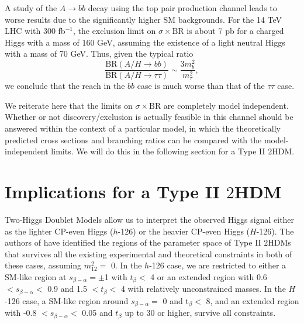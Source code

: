 A study of the $A \rightarrow bb$ decay using the top pair production channel leads to worse results due to the significantly higher SM backgrounds. For the 14 TeV LHC with 300 fb$^{-1}$, the exclusion limit on $\sigma \times \text{BR}$ is about 7 pb for a charged Higgs with a mass of 160 GeV, assuming the existence of a light neutral Higgs with a mass of 70 GeV. Thus, given the typical ratio 
\[\frac{\text{BR}(A/H \rightarrow bb)}{\text{BR}(A/H\rightarrow \tau\tau)} \sim \frac{3m^2_b}{m^2_{\tau}},\]
we conclude that the reach in the $bb$ case is much worse than that of the $\tau\tau$ case.

We reiterate here that the limits on $\sigma \times \text{BR}$ are completely model independent. Whether or not discovery/exclusion is actually feasible in this channel should be answered within the context of a particular model, in which the theoretically predicted cross sections and branching ratios can be compared with the model-independent limits. We will do this in the following section for a Type II $2$HDM. 

\section{Implications for a Type II $2$HDM}\label{sec:implication}

Two-Higgs Doublet Models allow us to interpret the observed Higgs signal either as the lighter CP-even Higgs ($h$-126) or the heavier CP-even Higgs ($H$-126). The authors of \cite{Coleppa:2013dya} have identified the regions of the parameter space of Type II $2$HDMs that survives all the existing experimental and theoretical constraints in both of these cases, assuming $m_{12}^2=$ 0. In the $h$-126 case, we are restricted to either a SM-like region at $s_{\beta-\alpha}=\pm$1 with $t_{\beta}<$ 4 or an extended region with 0.6 $<s_{\beta-\alpha}<$ 0.9 and 1.5 $<t_{\beta}<$ 4 with relatively unconstrained masses. In the $H$-126 case, a SM-like region around $s_{\beta-\alpha}=$ 0 and t$_{\beta}<$ 8, and an extended region with -0.8 $< s_{\beta-\alpha}<$ 0.05 and $t_{\beta}$ up to 30 or higher, survive all constraints. 
 
